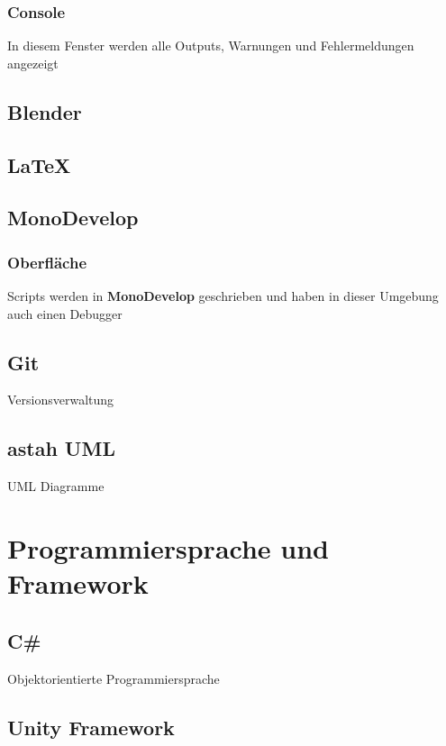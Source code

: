 \subsubsection{Console}
In diesem Fenster werden alle Outputs, Warnungen und Fehlermeldungen angezeigt

\subsection{Blender}

\subsection{LaTeX}

\subsection{MonoDevelop}

\subsubsection{Oberfläche}

Scripts werden in \textbf{MonoDevelop} geschrieben und haben in dieser Umgebung auch einen Debugger


\subsection{Git}

Versionsverwaltung

\subsection{astah UML}

UML Diagramme

\section{Programmiersprache und Framework}

\subsection{C\#}

Objektorientierte Programmiersprache

\subsection{Unity Framework}

